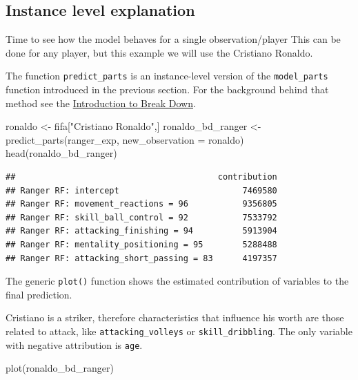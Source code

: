 \documentclass[
]{scrbook}
\newenvironment{Shaded}{\begin{snugshade}}{\end{snugshade}}
\newcommand{\AttributeTok}[1]{\textcolor[rgb]{0.77,0.63,0.00}{#1}}
\newcommand{\FunctionTok}[1]{\textcolor[rgb]{0.00,0.00,0.00}{#1}}
\newcommand{\NormalTok}[1]{#1}
\newcommand{\OtherTok}[1]{\textcolor[rgb]{0.56,0.35,0.01}{#1}}
\newcommand{\StringTok}[1]{\textcolor[rgb]{0.31,0.60,0.02}{#1}}
\renewenvironment{Shaded} {\begin{snugshade}\small} {\end{snugshade}}
\begin{document}
\hypertarget{interpretability-instance-level}{%
\subsection{Instance level explanation}\label{interpretability-instance-level}}

Time to see how the model behaves for a single observation/player
This can be done for any player, but this example we will use the Cristiano Ronaldo.

The function \texttt{predict\_parts} is an instance-level version of the \texttt{model\_parts} function introduced in the previous section. For the background behind that method see the \href{https://pbiecek.github.io/ema/breakDown.html}{Introduction to Break Down}.

\begin{Shaded}
\begin{Highlighting}[]
\NormalTok{ronaldo }\OtherTok{\textless{}{-}}\NormalTok{ fifa[}\StringTok{"Cristiano Ronaldo"}\NormalTok{,]}
\NormalTok{ronaldo\_bd\_ranger }\OtherTok{\textless{}{-}} \FunctionTok{predict\_parts}\NormalTok{(ranger\_exp,}
                        \AttributeTok{new\_observation =}\NormalTok{ ronaldo)}
\FunctionTok{head}\NormalTok{(ronaldo\_bd\_ranger)}
\end{Highlighting}
\end{Shaded}

\begin{verbatim}
##                                         contribution
## Ranger RF: intercept                         7469580
## Ranger RF: movement_reactions = 96           9356805
## Ranger RF: skill_ball_control = 92           7533792
## Ranger RF: attacking_finishing = 94          5913904
## Ranger RF: mentality_positioning = 95        5288488
## Ranger RF: attacking_short_passing = 83      4197357
\end{verbatim}

The generic \texttt{plot()} function shows the estimated contribution of variables to the final prediction.

Cristiano is a striker, therefore characteristics that influence his worth are those related to attack, like \texttt{attacking\_volleys} or \texttt{skill\_dribbling}. The only variable with negative attribution is \texttt{age}.

\begin{Shaded}
\begin{Highlighting}[]
\FunctionTok{plot}\NormalTok{(ronaldo\_bd\_ranger)}
\end{Highlighting}
\end{Shaded}
\end{document}
